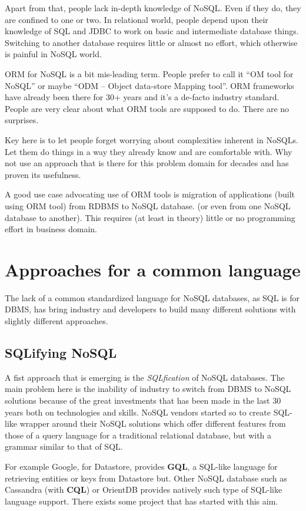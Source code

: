 Apart from that, people lack in-depth knowledge of NoSQL. Even if they do, they are confined to one or two. In relational world, people depend upon their knowledge of SQL and JDBC to work on basic and intermediate database things. Switching to another database requires little or almost no effort, which otherwise is painful in NoSQL  world.

ORM for NoSQL is a bit mis-leading term. People prefer to call it “OM tool for NoSQL” or maybe “ODM – Object data-store Mapping tool”. ORM frameworks have already been there for 30+ years and it’s a de-facto industry standard. People are very clear about what ORM tools are supposed to do. There are no surprises.

Key here is to let people forget worrying about complexities inherent in NoSQLs. Let them do things in a way they already know and are comfortable with. Why not use an approach that is there for this problem domain for decades and has proven its usefulness.

A good use case advocating use of ORM tools is migration of applications (built using ORM tool) from RDBMS to NoSQL database. (or even from one NoSQL database to another). This requires (at least in theory) little or no programming effort in business domain.

\section{Approaches for a common language}
\label{sec:common-language}
The lack of a common standardized language for NoSQL databases, as SQL is for DBMS, has bring industry and developers to build many different solutions with slightly different approaches.

\subsection{SQLifying NoSQL}
A fist approach that is emerging is the \textit{SQLfication} of NoSQL databases.
The main problem here is the inability of industry to switch from DBMS to NoSQL solutions because of the great investments that has been made in the last 30 years both on technologies and skills.
NoSQL vendors started so to create SQL-like wrapper around their NoSQL solutions which offer different features from those of a query language for a traditional relational database, but with a grammar similar to that of SQL.

\noindent For example Google, for Datastore, provides \textbf{GQL}, a SQL-like language for retrieving entities or keys from Datastore but.
Other NoSQL database such as Cassandra (with \textbf{CQL}) or OrientDB provides natively such type of SQL-like language support.
There exists some project that has started with this aim.

